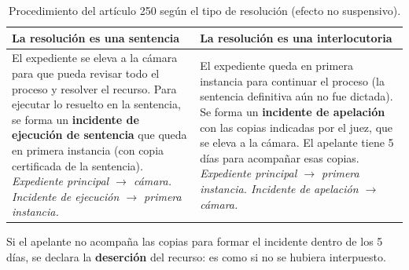 \documentclass[12pt,oneside]{book}
\begin{document}
\begin{table}[H]
\centering
\begin{tabularx}{\textwidth}{
    >{\raggedright\arraybackslash}X
    >{\raggedright\arraybackslash}X
}
\toprule
\textbf{La resoluci\'on es una sentencia} & \textbf{La resoluci\'on es una interlocutoria} \\
\midrule
El expediente se eleva a la c\'amara para que pueda revisar todo el proceso y resolver el recurso. Para ejecutar lo resuelto en la sentencia, se forma un \textbf{incidente de ejecuci\'on de sentencia} que queda en primera instancia (con copia certificada de la sentencia). \newline
\textit{Expediente principal $\rightarrow$ c\'amara. Incidente de ejecuci\'on $\rightarrow$ primera instancia.} &
El expediente queda en primera instancia para continuar el proceso (la sentencia definitiva a\'un no fue dictada). Se forma un \textbf{incidente de apelaci\'on} con las copias indicadas por el juez, que se eleva a la c\'amara. El apelante tiene 5 d\'ias para acompa\~nar esas copias. \newline
\textit{Expediente principal $\rightarrow$ primera instancia. Incidente de apelaci\'on $\rightarrow$ c\'amara.} \\
\bottomrule
\end{tabularx}
\caption{Procedimiento del art\'iculo 250 seg\'un el tipo de resoluci\'on (efecto no suspensivo).}
\end{table}

Si el apelante no acompa\~na las copias para formar el incidente dentro de los 5 d\'ias, se declara la \textbf{deserci\'on} del recurso: es como si no se hubiera interpuesto.
\end{document}
